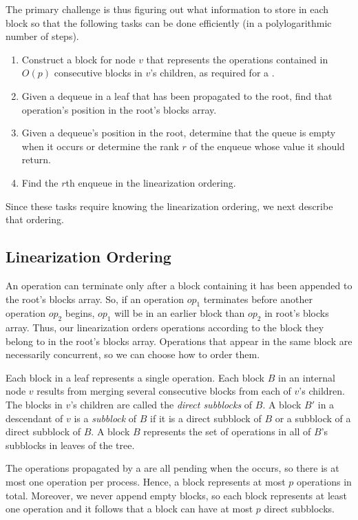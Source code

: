 The primary challenge is thus figuring out what information to store in each block so that 
the following tasks can be done efficiently (in a polylogarithmic number of steps).
\begin{enumerate}[label={(T\arabic*)}]
\item
\label{construct}
Construct a block for node $v$ that represents the operations contained in $O(p)$ consecutive blocks in $v$'s children, as required for a .
\item
\label{findinroot}
Given a dequeue in a leaf that has been propagated to the root, find that operation's position in the root's blocks array.
\item
\label{findrank}
Given a dequeue's position in the root, determine that the queue is empty when it occurs
or determine the rank $r$ of the enqueue whose value it should return.
\item
\label{findenqueue}
Find the $r$th enqueue in the linearization ordering.
\end{enumerate}
Since these tasks require knowing the linearization ordering, we next describe that ordering.

\subsection{Linearization Ordering}

An operation can terminate only after a block containing it has been appended to the root's blocks array.
So, if an operation $op_1$ terminates before another operation $op_2$ begins, 
$op_1$ will be in an earlier block than $op_2$ in root's blocks array.
Thus, our linearization orders operations according to the block they belong to in the root's blocks array.
Operations that appear in the same block are necessarily concurrent, so we can choose how to order them.

Each block in a leaf represents a single operation.
Each block $B$ in an internal node $v$ results from merging
several consecutive blocks from each of $v$'s children.
The blocks in $v$'s children are called the \emph{direct subblocks} of $B$.
A block $B'$ in a descendant of $v$ is a \emph{subblock} of $B$ if it is a direct subblock of $B$
or a subblock of a direct subblock of $B$.
A block $B$ represents the set of operations in all of $B$'s subblocks in leaves of the tree.

The operations propagated by a  are all pending when the  occurs,
so there is at most one operation per process.
Hence, a block represents at most $p$ operations in total.  
Moreover, we never append empty blocks, so 
each block represents at least one operation and it follows that a block can have at most $p$ direct subblocks.

